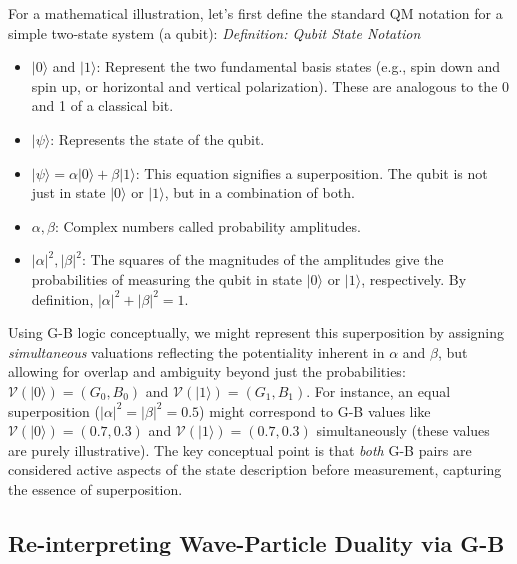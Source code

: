 \documentclass{article}
\begin{document}
For a mathematical illustration, let's first define the standard QM notation for a simple two-state system (a qubit):
\vspace{\baselineskip}
\noindent\textit{Definition: Qubit State Notation}
\begin{itemize}
    \item $|0\rangle$ and $|1\rangle$: Represent the two fundamental basis states (e.g., spin down and spin up, or horizontal and vertical polarization). These are analogous to the 0 and 1 of a classical bit.
    \item $|\psi\rangle$: Represents the state of the qubit.
    \item $|\psi\rangle = \alpha |0\rangle + \beta |1\rangle$: This equation signifies a superposition. The qubit is not just in state $|0\rangle$ or $|1\rangle$, but in a combination of both.
    \item $\alpha, \beta$: Complex numbers called probability amplitudes.
    \item $|\alpha|^2, |\beta|^2$: The squares of the magnitudes of the amplitudes give the probabilities of measuring the qubit in state $|0\rangle$ or $|1\rangle$, respectively. By definition, $|\alpha|^2 + |\beta|^2 = 1$.
\end{itemize}
\vspace{\baselineskip}

Using G-B logic conceptually, we might represent this superposition by assigning \textit{simultaneous} valuations reflecting the potentiality inherent in $\alpha$ and $\beta$, but allowing for overlap and ambiguity beyond just the probabilities: $\mathcal{V}(|0\rangle) = (G_0, B_0)$ and $\mathcal{V}(|1\rangle) = (G_1, B_1)$. For instance, an equal superposition ($|\alpha|^2 = |\beta|^2 = 0.5$) might correspond to G-B values like $\mathcal{V}(|0\rangle) = (0.7, 0.3)$ and $\mathcal{V}(|1\rangle) = (0.7, 0.3)$ simultaneously (these values are purely illustrative). The key conceptual point is that \textit{both} G-B pairs are considered active aspects of the state description before measurement, capturing the essence of superposition.

\subsection{Re-interpreting Wave-Particle Duality via G-B}
\end{document}
